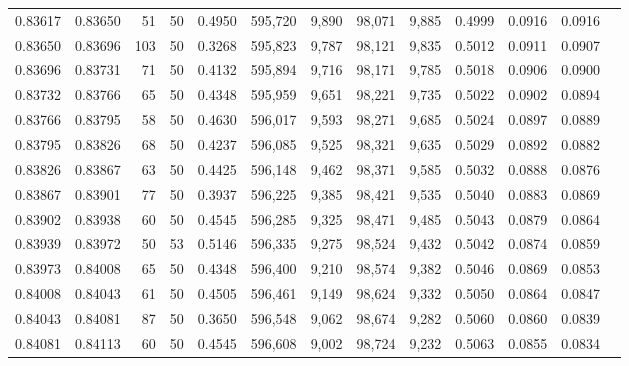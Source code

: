\begin{tabular}{rrrrrrrrrrrrr}
0.83617 & 0.83650 &    51 &  50 &                                     0.4950 & 595,720 &   9,890 &  98,071 &   9,885 & 0.4999 & 0.0916 & 0.0916 \\
0.83650 & 0.83696 &   103 &  50 &                                     0.3268 & 595,823 &   9,787 &  98,121 &   9,835 & 0.5012 & 0.0911 & 0.0907 \\
0.83696 & 0.83731 &    71 &  50 &                                     0.4132 & 595,894 &   9,716 &  98,171 &   9,785 & 0.5018 & 0.0906 & 0.0900 \\
0.83732 & 0.83766 &    65 &  50 &                                     0.4348 & 595,959 &   9,651 &  98,221 &   9,735 & 0.5022 & 0.0902 & 0.0894 \\
0.83766 & 0.83795 &    58 &  50 &                                     0.4630 & 596,017 &   9,593 &  98,271 &   9,685 & 0.5024 & 0.0897 & 0.0889 \\
0.83795 & 0.83826 &    68 &  50 &                                     0.4237 & 596,085 &   9,525 &  98,321 &   9,635 & 0.5029 & 0.0892 & 0.0882 \\
0.83826 & 0.83867 &    63 &  50 &                                     0.4425 & 596,148 &   9,462 &  98,371 &   9,585 & 0.5032 & 0.0888 & 0.0876 \\
0.83867 & 0.83901 &    77 &  50 &                                     0.3937 & 596,225 &   9,385 &  98,421 &   9,535 & 0.5040 & 0.0883 & 0.0869 \\
0.83902 & 0.83938 &    60 &  50 &                                     0.4545 & 596,285 &   9,325 &  98,471 &   9,485 & 0.5043 & 0.0879 & 0.0864 \\
0.83939 & 0.83972 &    50 &  53 &                                     0.5146 & 596,335 &   9,275 &  98,524 &   9,432 & 0.5042 & 0.0874 & 0.0859 \\
0.83973 & 0.84008 &    65 &  50 &                                     0.4348 & 596,400 &   9,210 &  98,574 &   9,382 & 0.5046 & 0.0869 & 0.0853 \\
0.84008 & 0.84043 &    61 &  50 &                                     0.4505 & 596,461 &   9,149 &  98,624 &   9,332 & 0.5050 & 0.0864 & 0.0847 \\
0.84043 & 0.84081 &    87 &  50 &                                     0.3650 & 596,548 &   9,062 &  98,674 &   9,282 & 0.5060 & 0.0860 & 0.0839 \\
0.84081 & 0.84113 &    60 &  50 &                                     0.4545 & 596,608 &   9,002 &  98,724 &   9,232 & 0.5063 & 0.0855 & 0.0834 \\

\end{tabular}
